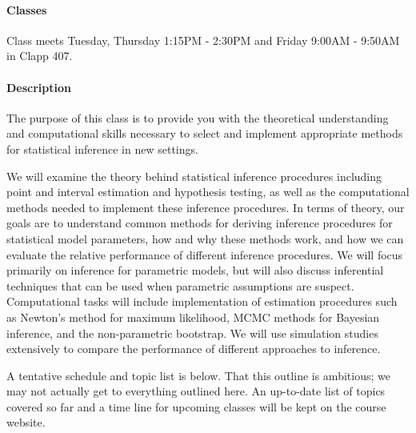 \documentclass[11pt]{article}
\begin{document}
\paragraph{Classes}

Class meets Tuesday, Thursday 1:15PM - 2:30PM and Friday 9:00AM - 9:50AM in Clapp 407.

\paragraph{Description}

The purpose of this class is to provide you with the theoretical understanding and computational skills necessary to select and implement appropriate methods for statistical inference in new settings.

We will examine the theory behind statistical inference procedures including point and interval estimation and hypothesis testing, as well as the computational methods needed to implement these inference procedures.  In terms of theory, our goals are to understand common methods for deriving inference procedures for statistical model parameters, how and why these methods work, and how we can evaluate the relative performance of different inference procedures.  We will focus primarily on inference for parametric models, but will also discuss inferential techniques that can be used when parametric assumptions are suspect.  Computational tasks will include implementation of estimation procedures such as Newton's method for maximum likelihood, MCMC methods for Bayesian inference, and the non-parametric bootstrap.  We will use simulation studies extensively to compare the performance of different approaches to inference.

A tentative schedule and topic list is below.  That this outline is ambitious; we may not actually get to everything outlined here.  An up-to-date list of topics covered so far and a time line for upcoming classes will be kept on the course website.
\end{document}

